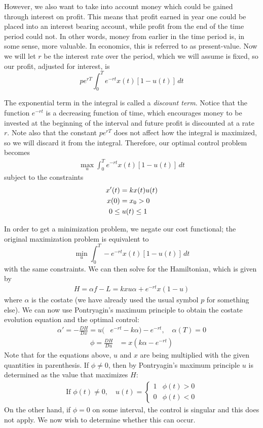 However, we also want to take into account money which could be gained through interest on profit. This means that profit earned in year one could be placed into an interest bearing account, while profit from the end of the time period could not. In other words, money from earlier in the time period is, in some sense, more valuable. In economics, this is referred to as present-value. Now we will let $r$ be the interest rate over the period, which we will assume is fixed, so our profit, adjusted for interest, is
\[pe^{rT} \int_0^T  e^{-rt} x(t)[1-u(t)] \, dt\]

The exponential term in the integral is called a \textit{discount term}.
Notice that the function $e^{-rt}$ is a decreasing function of time, which encourages money to be invested at the beginning of the interval and future profit is discounted at a rate $r$.
Note also that the constant $pe^{rT}$ does not affect how the integral is maximized, so we will discard it from the integral.
Therefore, our optimal control problem becomes
\begin{align}
\max_{u} \int_0^T  e^{-rt} x(t)[1-u(t)] \, dt
\end{align}
subject to the constraints
\begin{align}
    \label{eq:timberharvest:x}
    x'(t) &= kx(t)u(t) \\
    x(0) &= x_{0} > 0 \notag \\
    0 \leq&\; u(t) \leq 1 \notag
\end{align}

In order to get a minimization problem, we negate our cost functional; the original maximization problem is equivalent to
\[
\min_{u} \int_0^T  -e^{-rt} x(t)[1-u(t)] \, dt
\]
with the same constraints.
We can then solve for the Hamiltonian, which is given by
\begin{align*}
H = \alpha f - L = kxu\alpha+e^{-rt}x(1-u)
\end{align*}
where \(\alpha\) is the costate (we have already used the usual symbol \(p\) for something else).
We can now use Pontryagin's maximum principle to obtain the costate evolution equation and the optimal control:
\begin{align}
\label{eq:timber:costate}
\alpha ' = -\frac{DH}{Dx}=u(&e^{-rt} - k\alpha) - e^{-rt}, \quad \alpha(T)=0
\end{align}
\begin{align}
\label{eq:timber:phi}
\phi = \frac{D H}{D u} &= x(k\alpha - e^{-rt})
\end{align}
Note that for the equations above, $u$ and $x$ are being multiplied with the given quantities in parenthesis.
If \(\phi\neq 0\), then by Pontryagin's maximum principle \(u\) is determined as the value that maximizes \(H\):
\begin{align}
\label{eq:timber:get_u_from_phi}
\text{If }\phi(t)\neq 0,\quad u(t)=\begin{cases} 1& \phi(t)>0 \\ 0 & \phi(t) < 0\end{cases}
\end{align}
On the other hand, if \(\phi=0\) on some interval, the control is singular and this does not apply.
We now wish to determine whether this can occur.

